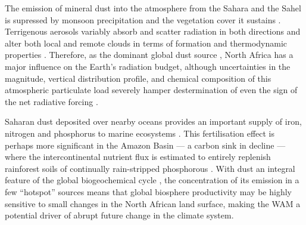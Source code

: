 \documentclass[a4paper]{article}
\begin{document}
The emission of mineral dust into the atmosphere from the Sahara and the Sahel is supressed by monsoon precipitation and the vegetation cover it sustains \parencite{brooks2000dust, cowie2013vegetation}.
Terrigenous aerosols variably absorb and scatter radiation in both directions \parencite{andreae1995climatic, tegen1996influence, haywood2000estimates} and alter both local and remote clouds in terms of formation and thermodynamic properties \parencite{rosenfeld2001desert, demott2003african, huang2006possible, karydis2011effect}.  
Therefore, as the dominant global dust source \parencite{tanaka2006numerical}, North Africa has a major influence on the Earth's radiation budget, although uncertainties in the magnitude, vertical distribution profile, and chemical composition of this atmospheric particulate load severely hamper destermination of even the sign of the net radiative forcing \parencite{claquin1998uncertainties, sokolik2001introduction, durant2009sensitivity}.

Saharan dust deposited over nearby oceans provides an important supply of iron, nitrogen and phosphorus to marine ecosystems \parencite{prospero1996saharan, prospero1996atmospheric, guieu2002chemical, mills2004iron, bristow2010fertilizing, okin2011impacts}.
This fertilisation effect is perhaps more significant in the Amazon Basin --- a carbon sink in decline \parencite{brienen2015long} --- where the intercontinental nutrient flux is estimated to entirely replenish rainforest soils of continually rain-stripped phosphorous \parencite{swap1992saharan, bristow2010fertilizing, yu2015fertilizing}.
With dust an integral feature of the global biogeochemical cycle \parencite{ridgwell2002dust, harrison2001role, jickells2005global, mahowald2005atmospheric}, the concentration of its emission in a few ``hotspot'' sources \parencite{koren2006bodele, ben2010transport, schepanski2009saharan, knippertz2010central} means that global biosphere productivity may be highly sensitive to small changes in the North African land surface, making the WAM a potential driver of abrupt future change in the climate system.
\end{document}

